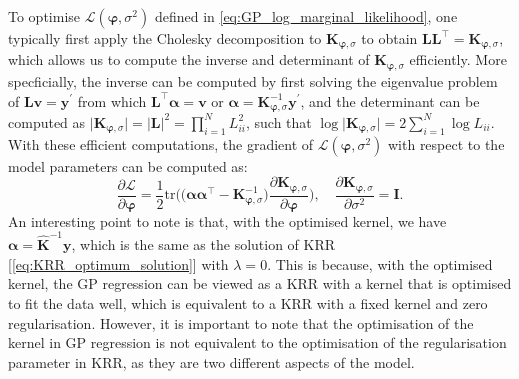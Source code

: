To optimise $\mathcal{L}(\boldsymbol{\varphi},\sigma^2)$ defined in \cref{eq:GP_log_marginal_likelihood}, one typically first apply the Cholesky decomposition to $\bm{K}_{\boldsymbol{\varphi},\sigma}$ to obtain $\bm{L}\bm{L}^\top=\bm{K}_{\boldsymbol{\varphi},\sigma}$, which allows us to compute the inverse and determinant of $\bm{K}_{\boldsymbol{\varphi},\sigma}$ efficiently. More specficially, the inverse can be computed by first solving the eigenvalue problem of $\bm{L}\bm{v}=\bm{y}^\prime$ from which $\bm{L}^\top\boldsymbol{\alpha}=\bm{v}$ or $\boldsymbol{\alpha}=\bm{K}_{\boldsymbol{\varphi},\sigma}^{-1}\bm{y}^\prime$, and the determinant can be computed as $\vert\bm{K}_{\boldsymbol{\varphi},\sigma}\vert=\vert\bm{L}\vert^2=\prod_{i=1}^N L_{ii}^2$, such that $\log\vert\bm{K}_{\boldsymbol{\varphi},\sigma}\vert=2\sum_{i=1}^N \log L_{ii}$. With these efficient computations, the gradient of $\mathcal{L}(\boldsymbol{\varphi},\sigma^2)$ with respect to the model parameters can be computed as:
\begin{equation}    \label{eq:GP_log_marginal_likelihood_gradient}
    \frac{\partial\mathcal{L}}{\partial\boldsymbol{\varphi}}=\frac{1}{2}\mathrm{tr}\bigg(\big(\boldsymbol{\alpha}\boldsymbol{\alpha}^\top-\bm{K}_{\boldsymbol{\varphi},\sigma}^{-1}\big)\frac{\partial\bm{K}_{\boldsymbol{\varphi},\sigma}}{\partial\boldsymbol{\varphi}}\bigg),\quad\frac{\partial\mathbf{K}_{\boldsymbol{\varphi},\sigma}}{\partial\sigma^2}=\bm{I}.
\end{equation}
An interesting point to note is that, with the optimised kernel, we have $\boldsymbol{\alpha}=\hat{\bm{K}}^{-1}\bm{y}$, which is the same as the solution of KRR [\cref{eq:KRR_optimum_solution}] with $\lambda=0$. This is because, with the optimised kernel, the GP regression can be viewed as a KRR with a kernel that is optimised to fit the data well, which is equivalent to a KRR with a fixed kernel and zero regularisation. However, it is important to note that the optimisation of the kernel in GP regression is not equivalent to the optimisation of the regularisation parameter in KRR, as they are two different aspects of the model.

